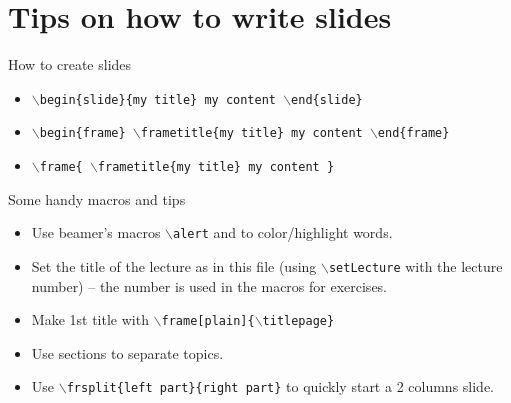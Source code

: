 \documentclass[aspectratio=169]{beamer}
\begin{document}
\frame[plain]{\titlepage}


\section{Tips on how to write slides}


\begin{slide}{How to create slides}
\small

\begin{itemize}
	\item \alert{\texttt{$\backslash$begin\{slide\}\{my title\} my content $\backslash$end\{slide\}}}
	\item \alert{\texttt{$\backslash$begin\{frame\} $\backslash$frametitle\{my title\} my content $\backslash$end\{frame\}}}
	\item \alert{\texttt{$\backslash$frame\{ $\backslash$frametitle\{my title\} my content \}}}
\end{itemize}
\end{slide}


\begin{slide}{Some handy macros and tips}
  \begin{itemize}
    \item Use beamer's macros \alert{\texttt{$\backslash$alert}} and  to color/highlight words.

    \item{Set the title of the lecture as in this file (using \alert{\texttt{$\backslash$setLecture}} with the lecture number) -- the number is used in the macros for exercises.}

		\item Make 1st title with \alert{\texttt{$\backslash$frame[plain]\{$\backslash$titlepage\}}}

		\item Use sections to separate topics.

    \item Use \alert{\texttt{$\backslash$frsplit\{left part\}\{right part\}}} to quickly start a 2 columns slide.
  \end{itemize}
\end{slide}
\end{document}
